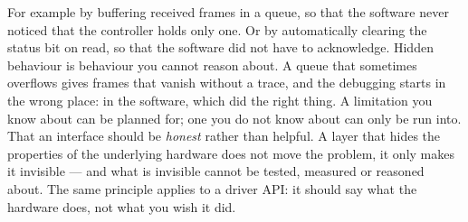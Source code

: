  For example by buffering received frames in a queue, so that the software never noticed that
the controller holds only one. Or by automatically clearing the status bit on read, so that the
software did not have to acknowledge.
 Hidden behaviour is behaviour you cannot reason about. A queue that sometimes overflows gives
frames that vanish without a trace, and the debugging starts in the wrong place: in the software,
which did the right thing. A limitation you know about can be planned for; one you do not know about
can only be run into.
 That an interface should be \emph{honest} rather than helpful. A layer that hides the
properties of the underlying hardware does not move the problem, it only makes it invisible --- and
what is invisible cannot be tested, measured or reasoned about. The same principle applies to a
driver API: it should say what the hardware does, not what you wish it did.
